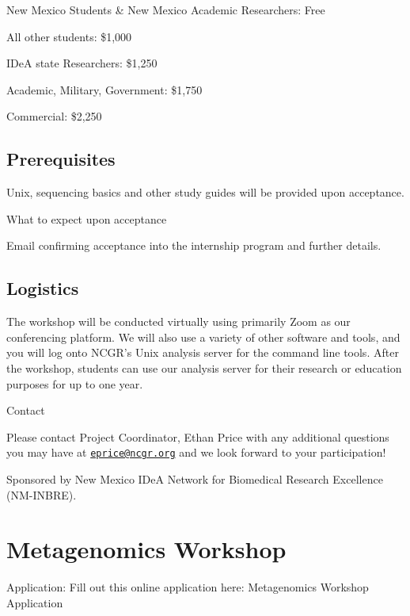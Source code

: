 \documentclass[
]{book}
\begin{document}
New Mexico Students \& New Mexico Academic Researchers:
Free

All other students:
\$1,000

IDeA state Researchers:
\$1,250

Academic, Military, Government:
\$1,750

Commercial:
\$2,250

\hypertarget{prerequisites-2}{%
\section*{Prerequisites}\label{prerequisites-2}}

Unix, sequencing basics and other study guides will be provided upon acceptance.

What to expect upon acceptance

Email confirming acceptance into the internship program and further details.

\hypertarget{logistics-2}{%
\section*{Logistics}\label{logistics-2}}

The workshop will be conducted virtually using primarily Zoom as our conferencing platform. We will also use a variety of other software and tools, and you will log onto NCGR's Unix analysis server for the command line tools. After the workshop, students can use our analysis server for their research or education purposes for up to one year.

Contact

Please contact Project Coordinator, Ethan Price with any additional questions you may have at \href{mailto:eprice@ncgr.org}{\nolinkurl{eprice@ncgr.org}} and we look forward to your participation!

Sponsored by New Mexico IDeA Network for Biomedical Research Excellence (NM-INBRE).

\hypertarget{metagenomics-workshop}{%
\chapter*{Metagenomics Workshop}\label{metagenomics-workshop}}

Application: Fill out this online application here: Metagenomics Workshop Application
\end{document}

